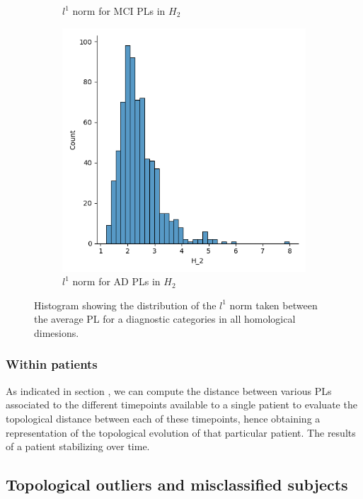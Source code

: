 \documentclass{article}
\begin{document}
\begin{figure}
\begin{subfigure}{0.3\textwidth}
    \caption{$l^1$ norm for MCI PLs in $H_2$}
  \end{subfigure}
  \begin{subfigure}{0.3\textwidth}
    \includegraphics[width=\textwidth]{figures/average_pls/average_pl_AD_H_2.png}
    \caption{$l^1$ norm for AD PLs in $H_2$}
  \end{subfigure}
  \caption{Histogram showing the distribution of the $l^1$ norm taken between the average PL for a diagnostic categories in all homological dimesions.}
  \label{fig:displots_average_pl}
\end{figure}

\subsubsection{Within patients}

As indicated in section \label{sec:tda_setup}, we can compute the distance between various PLs associated to the different timepoints available to a single patient to evaluate the topological distance between each of these timepoints, hence obtaining a representation of the topological evolution of that particular patient. The results of a patient stabilizing over time.

\subsection{Topological outliers and misclassified subjects}
\end{document}
